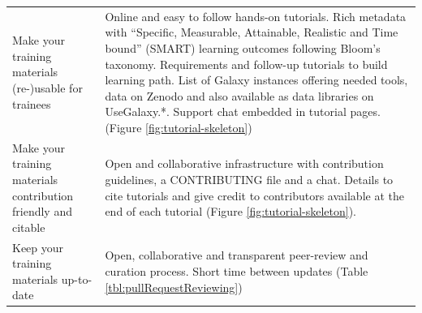 \documentclass[10pt,letterpaper]{article}
\begin{document}
\begin{table}[h!]
\begin{tabular}{p{}p{}}
		Make your training materials (re-)usable for trainees                          & Online and easy to follow hands-on tutorials. Rich metadata with ``Specific, Measurable, Attainable, Realistic and Time bound'' (SMART) learning outcomes following Bloom's taxonomy. Requirements and follow-up tutorials to build learning path. List of Galaxy instances offering needed tools, data on Zenodo and also available as data libraries on UseGalaxy.*. Support chat embedded in tutorial pages. (Figure \ref{fig:tutorial-skeleton})\\
		Make your training materials contribution friendly and citable                & Open and collaborative infrastructure with contribution guidelines, a CONTRIBUTING file and a chat. Details to cite tutorials and give credit to contributors available at the end of each tutorial (Figure \ref{fig:tutorial-skeleton}).\\
		Keep your training materials up-to-date                                       & Open, collaborative and transparent peer-review and curation process. Short time between updates (Table \ref{tbl:pullRequestReviewing})\\
	\end{tabular}
\end{table}
\end{document}
